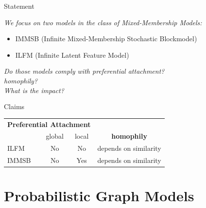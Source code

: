 %
%
%
%

\begin{frame}[t]{Statement}
    \vspace{3em}

    \textit{\Large{We focus on two models in the class of Mixed-Membership Models: }}
    \begin{itemize}
        \item IMMSB (Infinite Mixed-Membership Stochastic Blockmodel)
        \item ILFM (Infinite Latent Feature Model) 
    \end{itemize}

    \vspace{2em}

    \textit{\Large{Do those models comply with preferential attachment?}}\\
    \vspace{1em}
    \textit{\Large{homophily?}}\\
    \vspace{1em}
    \textit{\Large{What is the impact?}}


\pause

\begin{block}{Claims}
\begin{tabular}{l|cc|c}

        \multicolumn{3}{c}{\hspace{1.3cm}\textbf{Preferential Attachment}}   \\
        \cmidrule(l){2-3} 
        &   global & local  &   \textbf{homophily}      \\
        \hline
        ILFM       & \cellcolor{red!25}No & \cellcolor{red!25}No   & depends on similarity  \\
        IMMSB       & \cellcolor{red!25}No & \cellcolor{green!25}Yes  & depends on similarity \\
    \end{tabular}
\end{block}

\end{frame}

\section{Probabilistic Graph Models}

%
%


